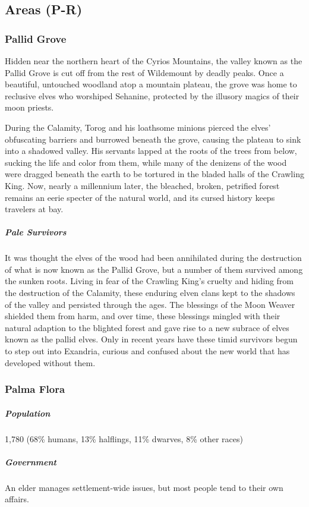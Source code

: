 \documentclass[10pt,a4paper,twoside,bg=print,twocolumn,openany,nodeprecatedcode]{dndbook}
\begin{document}
\subsection{Areas (P-R)}
\subsubsection{Pallid Grove}
Hidden near the northern heart of the Cyrios Mountains, the valley known as the Pallid Grove is cut off from the rest of Wildemount by deadly peaks. Once a beautiful, untouched woodland atop a mountain plateau, the grove was home to reclusive elves who worshiped Sehanine, protected by the illusory magics of their moon priests.

During the Calamity, Torog and his loathsome minions pierced the elves' obfuscating barriers and burrowed beneath the grove, causing the plateau to sink into a shadowed valley. His servants lapped at the roots of the trees from below, sucking the life and color from them, while many of the denizens of the wood were dragged beneath the earth to be tortured in the bladed halls of the Crawling King. Now, nearly a millennium later, the bleached, broken, petrified forest remains an eerie specter of the natural world, and its cursed history keeps travelers at bay.

\subparagraph{Pale Survivors}
It was thought the elves of the wood had been annihilated during the destruction of what is now known as the Pallid Grove, but a number of them survived among the sunken roots. Living in fear of the Crawling King's cruelty and hiding from the destruction of the Calamity, these enduring elven clans kept to the shadows of the valley and persisted through the ages. The blessings of the Moon Weaver shielded them from harm, and over time, these blessings mingled with their natural adaption to the blighted forest and gave rise to a new subrace of elves known as the pallid elves. Only in recent years have these timid survivors begun to step out into Exandria, curious and confused about the new world that has developed without them.

\subsubsection{Palma Flora}
\subparagraph{Population}
1,780 (68\% humans, 13\% halflings, 11\% dwarves, 8\% other races)

\subparagraph{Government}
An elder manages settlement-wide issues, but most people tend to their own affairs.
\end{document}
